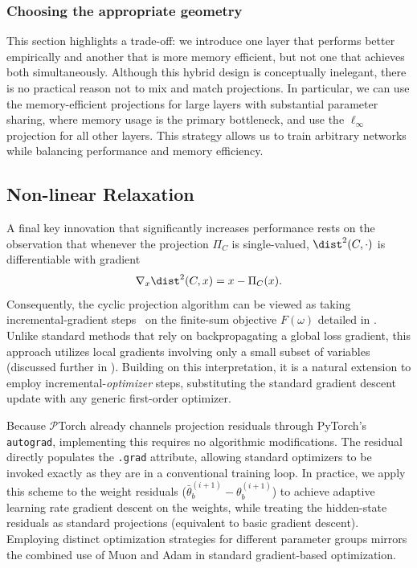 \documentclass{article}
\let\cref\crtcref
\begin{document}
\subsubsection{Choosing the appropriate geometry}
This section highlights a trade-off: we introduce one layer that performs better empirically and another that is more memory efficient, but not one that achieves both simultaneously. Although this hybrid design is conceptually inelegant, there is no practical reason not to mix and match projections. In particular, we can use the memory-efficient projections for large layers with substantial parameter sharing, where memory usage is the primary bottleneck, and use the $\ell_\infty$ projection for all other layers. This strategy allows us to train arbitrary networks while balancing performance and memory efficiency.
\subsection{Non-linear Relaxation}
\label{sec:relaxation}
A final key innovation that significantly increases performance rests on the observation that whenever the projection $\Pi_{C}$ is single-valued, $\dist^2(C, \cdot)$ is differentiable with gradient
\[
    \nabla_x \dist^2(C, x) = x - \Pi_C(x).
\] 
Consequently, the cyclic projection algorithm can be viewed as taking incremental-gradient steps~\cite{bertsekas1997nonlinear} on the finite-sum objective $F(\omega)$ detailed in \cref{sec:math_desc}. Unlike standard methods that rely on backpropagating a global loss gradient, this approach utilizes local gradients involving only a small subset of variables (discussed further in \cref{sec:incremental-grad-descent}). Building on this interpretation, it is a natural extension to employ incremental-\textit{optimizer} steps, substituting the standard gradient descent update with any generic first-order optimizer. 

Because $\mathcal{P}$Torch already channels projection residuals through PyTorch's \texttt{autograd}, implementing this requires no algorithmic modifications. The residual directly populates the \texttt{.grad} attribute, allowing standard optimizers to be invoked exactly as they are in a conventional training loop. In practice, we apply this scheme to the weight residuals ($\bar{\theta}^{(i+1)}_b - \theta^{(i+1)}_b$) to achieve adaptive learning rate gradient descent on the weights, while treating the hidden-state residuals as standard projections (equivalent to basic gradient descent). Employing distinct optimization strategies for different parameter groups mirrors the combined use of Muon and Adam \cite{jordan2024muon} in standard gradient-based optimization.
\end{document}
